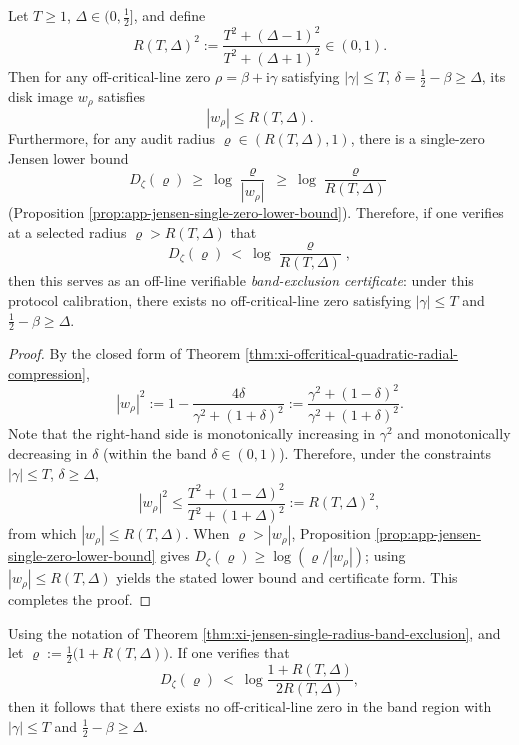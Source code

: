 \begin{theorem}\label{thm:xi-jensen-single-radius-band-exclusion}
Let \(T\ge 1\), \(\Delta\in(0,\tfrac12]\), and define
\[
  R(T,\Delta)^2:=\frac{T^2+(\Delta-1)^2}{T^2+(\Delta+1)^2}\in(0,1).
\]
Then for any off-critical-line zero \(\rho=\beta+\mathrm{i}\gamma\) satisfying \(|\gamma|\le T\), \(\delta=\tfrac12-\beta\ge\Delta\), its disk image \(w_\rho\) satisfies
\[
  |w_\rho|\le R(T,\Delta).
\]
Furthermore, for any audit radius \(\varrho\in(R(T,\Delta),1)\), there is a single-zero Jensen lower bound
\[
  D_\zeta(\varrho)\ \ge\ \log\frac{\varrho}{|w_\rho|}\ \ge\ \log\frac{\varrho}{R(T,\Delta)}
\]
(Proposition \ref{prop:app-jensen-single-zero-lower-bound}).
Therefore, if one verifies at a selected radius \(\varrho>R(T,\Delta)\) that
\[
  D_\zeta(\varrho)\ <\ \log\frac{\varrho}{R(T,\Delta)},
\]
then this serves as an off-line verifiable \emph{band-exclusion certificate}: under this protocol calibration, there exists no off-critical-line zero satisfying \(|\gamma|\le T\) and \(\tfrac12-\beta\ge\Delta\).
\end{theorem}

\begin{proof}
By the closed form of Theorem \ref{thm:xi-offcritical-quadratic-radial-compression},
\[
|w_\rho|^2
:=1-\frac{4\delta}{\gamma^2+(1+\delta)^2}
:=\frac{\gamma^2+(1-\delta)^2}{\gamma^2+(1+\delta)^2}.
\]
Note that the right-hand side is monotonically increasing in \(\gamma^2\) and monotonically decreasing in \(\delta\) (within the band \(\delta\in(0,1)\)).
Therefore, under the constraints \(|\gamma|\le T\), \(\delta\ge\Delta\),
\[
|w_\rho|^2
\le \frac{T^2+(1-\Delta)^2}{T^2+(1+\Delta)^2}
:=R(T,\Delta)^2,
\]
from which \(|w_\rho|\le R(T,\Delta)\).
When \(\varrho>|w_\rho|\), Proposition \ref{prop:app-jensen-single-zero-lower-bound} gives
\(
D_\zeta(\varrho)\ge \log(\varrho/|w_\rho|)
\);
using \(|w_\rho|\le R(T,\Delta)\) yields the stated lower bound and certificate form. This completes the proof.
\end{proof}

\begin{corollary}[Explicit single-point certificate taking \texorpdfstring{$\varrho=\tfrac12(1+R(T,\Delta))$}{varrho=(1+R)/2}]\label{cor:xi-jensen-single-radius-band-exclusion-midradius}
Using the notation of Theorem \ref{thm:xi-jensen-single-radius-band-exclusion}, and let
\(
\varrho:=\tfrac12\bigl(1+R(T,\Delta)\bigr)
\).
If one verifies that
\[
  D_\zeta(\varrho)\ <\ \log\frac{1+R(T,\Delta)}{2R(T,\Delta)},
\]
then it follows that there exists no off-critical-line zero in the band region with \(|\gamma|\le T\) and \(\tfrac12-\beta\ge\Delta\).
\end{corollary}

